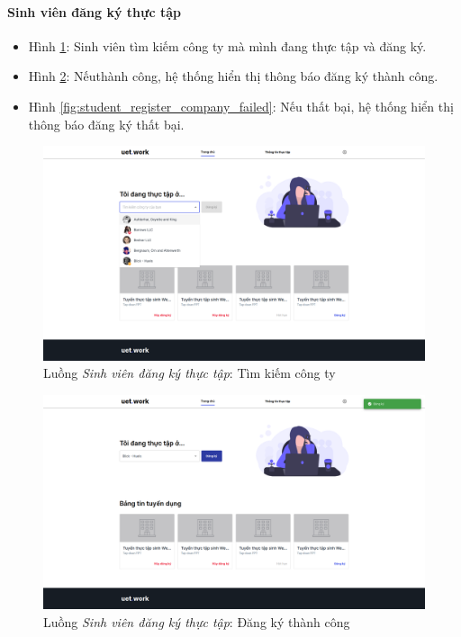 \documentclass[./../main.tex]{subfiles}
\begin{document}
\paragraph*{Sinh viên đăng ký thực tập}

\begin{itemize}
	\item Hình \ref{fig:student_find_company}: Sinh viên tìm kiếm công ty mà mình đang thực tập và đăng ký. 
	\item Hình \ref{fig:student_register_company_success}: Nếuthành công,  hệ thống hiển thị thông báo đăng ký thành công.
	\item Hình \ref{fig:student_register_company_failed}: Nếu thất bại, hệ thống hiển thị thông báo đăng ký thất bại.
\end{itemize}

\begin{figure}[]
	\includegraphics[width=\linewidth]{./images/image39.png}
	\caption{Luồng \emph{Sinh viên đăng ký thực tập}: Tìm kiếm công ty}
	\label{fig:student_find_company}
\end{figure}

\begin{figure}[]
	\includegraphics[width=\linewidth]{./images/image40-1.png}
	\caption{Luồng \emph{Sinh viên đăng ký thực tập}: Đăng ký thành công}
	\label{fig:student_register_company_success}
\end{figure}
\end{document}
